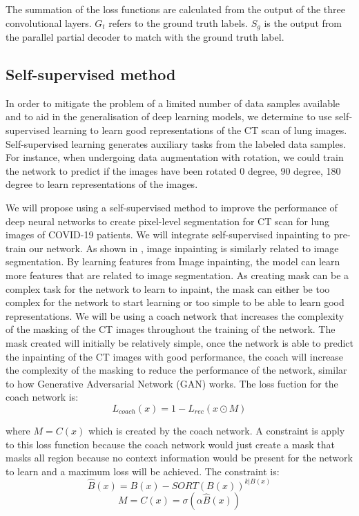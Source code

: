 The summation of the loss functions are calculated from the output of the three convolutional layers. $G_t$ refers to the ground truth labels. $S_g$ is the output from the parallel partial decoder to match with the ground truth label.

\subsection{Self-supervised method}
In order to mitigate the problem of a limited number of data samples available and to aid in the generalisation of deep learning models, we  determine to use self-supervised learning to learn good representations of the CT scan of lung images. Self-supervised learning generates auxiliary tasks from the labeled data samples. For instance, when undergoing data augmentation with rotation, we could train the network to predict if the images have been rotated 0 degree, 90 degree, 180 degree to learn representations of the images. 

We will propose using a self-supervised method to improve the performance of deep neural networks to create pixel-level segmentation for CT scan for lung images of COVID-19 patients. We will integrate self-supervised inpainting to pre-train our network. As shown in \cite{ref25}, image inpainting is similarly related to image segmentation. By learning features from Image inpainting, the model can learn more features that are related to image segmentation. As creating mask can be a complex task for the network to learn to inpaint, the mask can either be too complex for the network to start learning or too simple to be able to learn good representations. We will be using a coach network\cite{ref25} that increases the complexity of the masking of the CT images throughout the training of the network. The mask created will initially be relatively simple, once the network is able to predict the inpainting of the CT images with good performance, the coach will increase the complexity of the masking to reduce the performance of the network, similar to how Generative Adversarial Network (GAN) \cite{ref20} works. The loss fuction for the coach network is:
\begin{equation}
L_{coach}(x) = 1 - L_{rec}(x\odot M)
\end{equation}

where $M = C(x)$ which is created by the coach network. A constraint is apply to this loss function because the coach network would just create a mask that masks all region because no context information would be present for the network to learn and a maximum loss will be achieved. The constraint is:
\begin{equation}
\hat{B}(x) = B(x) - SORT(B(x))^{k|B(x)} 
\end{equation}
\begin{equation}
M = C(x) = \sigma (\alpha \hat{B}(x))
\end{equation}

